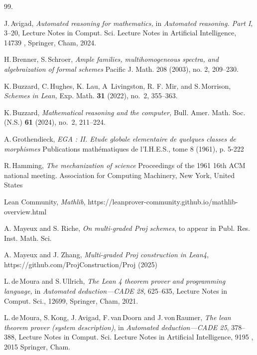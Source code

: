 \documentclass[graybox]{svmult}
\begin{document}
 \begin{thebibliography}{99.}


 J.\,Avigad, {\it Automated reasoning for mathematics,} in {\it Automated reasoning. Part I}, 3--20, Lecture Notes in Comput. Sci. Lecture Notes in Artificial Intelligence, 14739 , Springer, Cham, 2024.

 H.\,Brenner, S.\,Schroer, {\it Ample families, multihomogeneous spectra, and algebraization of formal schemes} Pacific J. Math. 208 (2003), no. 2, 209–230.

 K.\,Buzzard, C.\,Hughes, K. Lau, A\,
              Livingston, R. F. Mir, and S.\,Morrison, {\it Schemes in Lean,} Exp. Math. {\bf 31} (2022), no.~2, 355--363.
                 
              
              
 K.\,Buzzard, {\it Mathematical reasoning and the computer,} Bull. Amer. Math. Soc. (N.S.) {\bf 61} (2024), no.~2, 211--224.  



 A.\,Grothendieck, {\it EGA : II. Etude globale elementaire de quelques classes de morphismes} Publications mathématiques de l'I.H.E.S., tome 8 (1961), p. 5-222

 R.\,Hamming, {\it The mechanization of science} Proceedings of the 1961 16th ACM national meeting.     Association for Computing Machinery, New York, United States

 Lean Community, {\it Mathlib}, https://leanprover-community.github.io/mathlib-overview.html




A. Mayeux and S. Riche, \textit{\it On multi-graded Proj schemes}, to appear in Publ. Res. Inst. Math. Sci. 



A. Mayeux and J. Zhang, \textit{\it Multi-graded Proj construction in Lean4}, https://github.com/ProjConstruction/Proj (2025)

L.\,de\,Moura and S.\,Ullrich, {\it The Lean 4 theorem prover and programming language,} in {\it Automated deduction---CADE 28}, 625--635, Lecture Notes in Comput. Sci., 12699, Springer, Cham, 2021.

L.\,de\,Moura, S.\,Kong, J.\,Avigad, F.\,van\,Doorn and J.\,von\,Raumer, {\it The lean theorem prover (system description)}, in {\it Automated deduction---CADE 25}, 378--388, Lecture Notes in Comput. Sci. Lecture Notes in Artificial Intelligence, 9195 , 2015 Springer, Cham.


\end{thebibliography}
\end{document}
